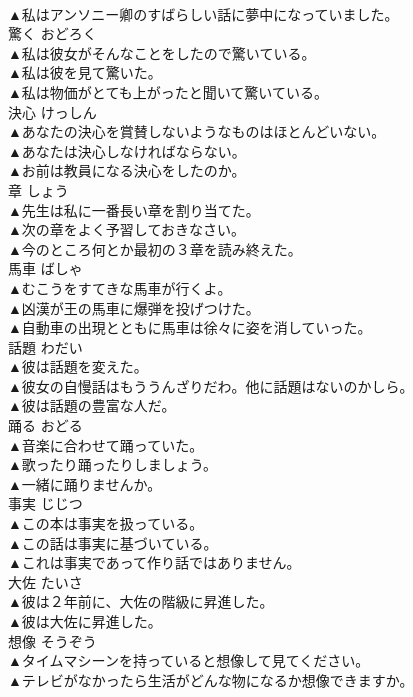 \documentclass[8pt]{extreport}
\begin{document}
\begin{CJK}{UTF8}{min}
\\	▲私はアンソニー卿のすばらしい話に夢中になっていました。 
\\	驚く	おどろく	
\\	▲私は彼女がそんなことをしたので驚いている。 
\\	▲私は彼を見て驚いた。 
\\	▲私は物価がとても上がったと聞いて驚いている。 
\\	決心	けっしん	
\\	▲あなたの決心を賞賛しないようなものはほとんどいない。 
\\	▲あなたは決心しなければならない。 
\\	▲お前は教員になる決心をしたのか。 
\\	章	しょう	
\\	▲先生は私に一番長い章を割り当てた。 
\\	▲次の章をよく予習しておきなさい。 
\\	▲今のところ何とか最初の３章を読み終えた。 
\\	馬車	ばしゃ	
\\	▲むこうをすてきな馬車が行くよ。 
\\	▲凶漢が王の馬車に爆弾を投げつけた。 
\\	▲自動車の出現とともに馬車は徐々に姿を消していった。 
\\	話題	わだい	
\\	▲彼は話題を変えた。 
\\	▲彼女の自慢話はもううんざりだわ。他に話題はないのかしら。 
\\	▲彼は話題の豊富な人だ。 
\\	踊る	おどる	
\\	▲音楽に合わせて踊っていた。 
\\	▲歌ったり踊ったりしましょう。 
\\	▲一緒に踊りませんか。 
\\	事実	じじつ	
\\	▲この本は事実を扱っている。 
\\	▲この話は事実に基づいている。 
\\	▲これは事実であって作り話ではありません。 
\\	大佐	たいさ	
\\	▲彼は２年前に、大佐の階級に昇進した。 
\\	▲彼は大佐に昇進した。 
\\	想像	そうぞう	
\\	▲タイムマシーンを持っていると想像して見てください。 
\\	▲テレビがなかったら生活がどんな物になるか想像できますか。 

\end{CJK}
\end{document}
